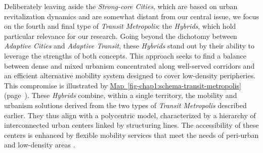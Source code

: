 \begin{refsegment}
Deliberately leaving aside the \textsl{Strong-core Cities}, which are based on urban revitalization dynamics and are somewhat distant from our central issue, we focus on the fourth and final type of \textsl{Transit Metropolis}: the \textsl{Hybrids}, which hold particular relevance for our research. Going beyond the dichotomy between \textsl{Adaptive Cities} and \textsl{Adaptive Transit}, these \textsl{Hybrids} stand out by their ability to leverage the strengths of both concepts. This approach seeks to find a balance between dense and mixed urbanism concentrated along well-served corridors and an efficient alternative mobility system designed to cover low-density peripheries. This compromise is illustrated by \hyperref[fig-chap1:schema-transit-metropolis]{Map~\ref{fig-chap1:schema-transit-metropolis}} (page~\pageref{fig-chap1:schema-transit-metropolis}). These \textsl{Hybrids} combine, within a single territory, the mobility and urbanism solutions derived from the two types of \textsl{Transit Metropolis} described earlier. They thus align with a polycentric model, characterized by a hierarchy of interconnected urban centers linked by structuring lines. The accessibility of these centers is enhanced by flexible mobility services that meet the needs of peri-urban and low-density areas \textcolor{blue}{\autocite[213-295]{cervero_transit_1998}}.%


\end{refsegment}
